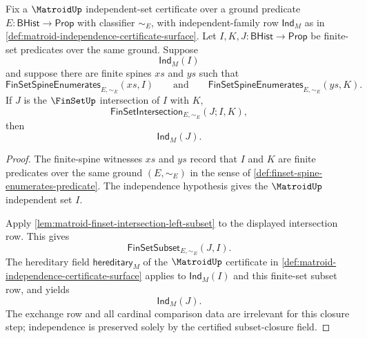 \begin{theorem}
\label{thm:matroid-intersection-preserves-independence}
Fix a $\MatroidUp$ independent-set certificate over a ground predicate $E:\mathsf{BHist}\to\mathsf{Prop}$ with classifier $\sim_E$, with independent-family row $\mathsf{Ind}_M$ as in \autoref{def:matroid-independence-certificate-surface}. Let $I,K,J:\mathsf{BHist}\to\mathsf{Prop}$ be finite-set predicates over the same ground. Suppose
$$
\mathsf{Ind}_M(I)
$$
and suppose there are finite spines $xs$ and $ys$ such that
$$
\mathsf{FinSetSpineEnumerates}_{E,\sim_E}(xs,I)
\qquad\text{and}\qquad
\mathsf{FinSetSpineEnumerates}_{E,\sim_E}(ys,K).
$$
If $J$ is the $\FinSetUp$ intersection of $I$ with $K$,
$$
\mathsf{FinSetIntersection}_{E,\sim_E}(J;I,K),
$$
then
$$
\mathsf{Ind}_M(J).
$$
\end{theorem}
\begin{proof}
The finite-spine witnesses $xs$ and $ys$ record that $I$ and $K$ are finite predicates over the same ground $(E,\sim_E)$ in the sense of \autoref{def:finset-spine-enumerates-predicate}. The independence hypothesis gives the $\MatroidUp$ independent set $I$.

Apply \autoref{lem:matroid-finset-intersection-left-subset} to the displayed intersection row. This gives
$$
\mathsf{FinSetSubset}_{E,\sim_E}(J,I).
$$
The hereditary field $\mathsf{hereditary}_M$ of the $\MatroidUp$ certificate in \autoref{def:matroid-independence-certificate-surface} applies to $\mathsf{Ind}_M(I)$ and this finite-set subset row, and yields
$$
\mathsf{Ind}_M(J).
$$
The exchange row and all cardinal comparison data are irrelevant for this closure step; independence is preserved solely by the certified subset-closure field.
\end{proof}


